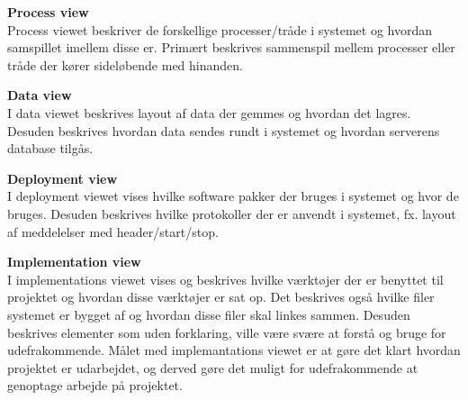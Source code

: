 \textbf{Process view}\\
Process viewet beskriver de forskellige processer/tråde i systemet og hvordan samspillet imellem disse er. Primært beskrives sammenspil mellem processer eller tråde der kører sideløbende med hinanden.

\textbf{Data view}\\
I data viewet beskrives layout af data der gemmes og hvordan det lagres. Desuden beskrives hvordan data sendes rundt i systemet og hvordan serverens database tilgås. 

\textbf{Deployment view}\\
I deployment viewet vises hvilke software pakker der bruges i systemet og hvor de bruges. Desuden beskrives hvilke protokoller der er anvendt i systemet, fx. layout af meddelelser med header/start/stop. 
  

\textbf{Implementation view}\\
I implementations viewet vises og beskrives hvilke værktøjer der er benyttet til projektet og hvordan disse værktøjer er sat op. Det beskrives også hvilke filer systemet er bygget af og hvordan disse filer skal linkes sammen. 
Desuden beskrives elementer som uden forklaring, ville være svære at forstå og bruge for udefrakommende. Målet med implemantations viewet er at gøre det klart hvordan projektet er udarbejdet, og derved gøre det muligt for udefrakommende at genoptage arbejde på projektet.


